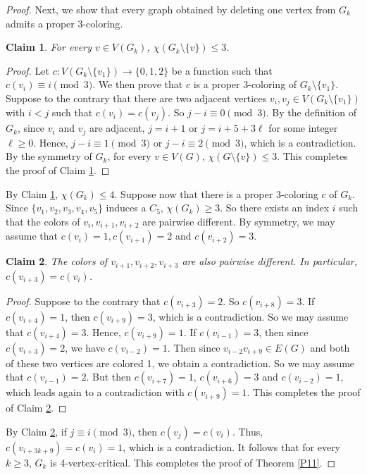\documentclass[10pt,a4paper]{amsart}
\newtheorem{claim}{Claim}
\begin{document}
\begin{proof}
    Next, we show that every graph obtained by deleting one vertex from $G_k$ admits a proper 3-coloring. 
    \begin{claim}\label{claim:critical of G_k}
        For every $v\in V(G_k)$, $\chi(G_k\setminus \{v\})\leq 3$. 
    \end{claim}
    \begin{proof}
        Let $c: V(G_k\setminus \{v_1\}) \to \{0,1,2\}$ be a function such that $c(v_i)\equiv i\pmod{3}$. 
        We then prove that $c$ is a proper 3-coloring of $G_k\setminus \{v_1\}$. 
        Suppose to the contrary that there are two adjacent vertices $v_i,v_j\in V(G_k\setminus \{v_1\})$ with $i<j$ such that $c(v_i)=c(v_j)$.
        So $j-i \equiv 0\pmod{3}$. 
        By the definition of $G_k$, since $v_i$ and $v_j$ are adjacent, $j=i+1$ or $j=i+5+3\ell$ for some integer $\ell \geq 0$. 
        Hence, $j-i \equiv 1\pmod{3}$ or $j-i \equiv 2\pmod{3}$, which is a contradiction. 
        By the symmetry of $G_k$, for every $v\in V(G)$, $\chi(G\setminus \{v\})\leq 3$. 
        This completes the proof of Claim \ref{claim:critical of G_k}.
    \end{proof}
    By Claim \ref{claim:critical of G_k}, $\chi(G_k)\leq 4$. 
    Suppose now that there is a proper 3-coloring $c$ of $G_k$. 
	Since $\{v_1,v_2,v_3,v_4,v_5\}$ induces a $C_5$, $\chi(G_k)\geq 3$. 
	So there exists an index $i$ such that the colors of $v_i,v_{i+1},v_{i+2}$ are pairwise different. 
	By symmetry, we may assume that $c(v_i)=1,c(v_{i+1})=2$ and $c(v_{i+2})=3$. 
    \begin{claim}\label{claim:3-coloring contradict}
        The colors of $v_{i+1},v_{i+2},v_{i+3}$ are also pairwise different. 
        In particular, $c(v_{i+3})=c(v_i)$.
    \end{claim}
   \begin{proof}
       Suppose to the contrary that $c(v_{i+3})=2$. 
       So $c(v_{i+8})=3$. 
       If $c(v_{i+4})=1$, then $c(v_{i+9})=3$, which is a contradiction. 
       So we may assume that $c(v_{i+4})=3$. 
       Hence, $c(v_{i+9})=1$.  
       If $c(v_{i-1})=3$, then since $c(v_{i+3})=2$, we have $c(v_{i-2})=1$. 
       Then since $v_{i-2}v_{i+9}\in E(G)$ and both of these two vertices are colored 1, we obtain a contradiction.  
       So we may assume that $c(v_{i-1})=2$. But then $c(v_{i+7})=1$, $c(v_{i+6})=3$ and $c(v_{i-2})=1$, which leads again to a contradiction with $c(v_{i+9})=1$. 
       This completes the proof of Claim \ref{claim:3-coloring contradict}.
   \end{proof}
		
	By Claim \ref{claim:3-coloring contradict}, if $j\equiv i\pmod{3}$, then $c(v_j)=c(v_i)$. 
    Thus, $c(v_{i+3k+9})=c(v_{i})=1$, which is a contradiction. 
    It follows that for every $k\geq 3$, $G_k$ is 4-vertex-critical. 
    This completes the proof of Theorem \ref{P11}.
\end{proof}
\end{document}
